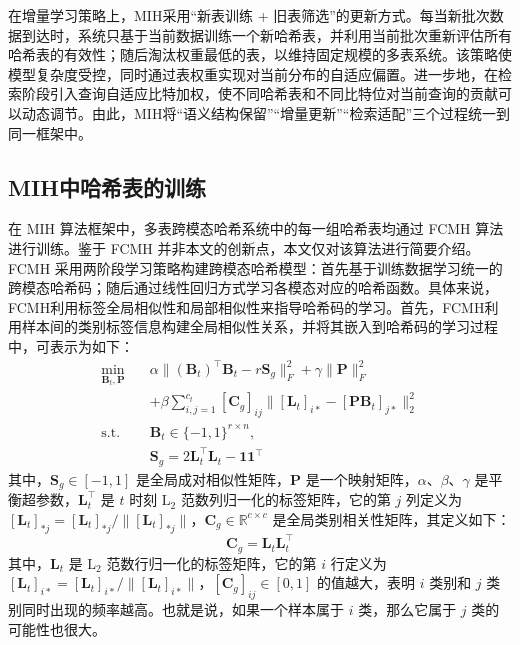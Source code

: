 在增量学习策略上，MIH采用“新表训练 + 旧表筛选”的更新方式。每当新批次数据到达时，系统只基于当前数据训练一个新哈希表，并利用当前批次重新评估所有哈希表的有效性；随后淘汰权重最低的表，以维持固定规模的多表系统。该策略使模型复杂度受控，同时通过表权重实现对当前分布的自适应偏置。进一步地，在检索阶段引入查询自适应比特加权，使不同哈希表和不同比特位对当前查询的贡献可以动态调节。由此，MIH将“语义结构保留”“增量更新”“检索适配”三个过程统一到同一框架中。

\subsection{MIH中哈希表的训练}
在 MIH 算法框架中，多表跨模态哈希系统中的每一组哈希表均通过 FCMH 算法进行训练。鉴于 FCMH 并非本文的创新点，本文仅对该算法进行简要介绍。FCMH 采用两阶段学习策略构建跨模态哈希模型：首先基于训练数据学习统一的跨模态哈希码；随后通过线性回归方式学习各模态对应的哈希函数。具体来说，FCMH利用标签全局相似性和局部相似性来指导哈希码的学习。首先，FCMH利用样本间的类别标签信息构建全局相似性关系，并将其嵌入到哈希码的学习过程中，可表示为如下：
\begin{equation}
  \begin{aligned}
    \min_{\mathbf{B}_t,\mathbf{P}} \quad
    & \alpha \|(\mathbf{B}_t)^{\top} \mathbf{B}_t - r \mathbf{S}_g\|_F^2 + \gamma \|\mathbf{P}\|_F^2 \\
    & + \beta \sum_{i,j=1}^{c_t} [\mathbf{C}_g]_{ij}
    \|[\mathbf{L}_t]_{i*} - [\mathbf{P}\mathbf{B}_t]_{j*}\|_2^2 \\
    \text{s.t.} \quad
    & \mathbf{B}_t \in \{-1,1\}^{r \times n}, \\
    & \mathbf{S}_g = 2\mathbf{L}_t^{\top}\mathbf{L}_t - \mathbf{1}\mathbf{1}^{\top}
  \end{aligned}
\end{equation}
其中，$\mathbf{S}_g \in [-1,1]$ 是全局成对相似性矩阵，$\mathbf{P}$ 是一个映射矩阵，$\alpha$、$\beta$、$\gamma$ 是平衡超参数，$\mathbf{L}_t^{\top}$ 是 $t$ 时刻 $\text{L}_2$ 范数列归一化的标签矩阵，它的第 $j$ 列定义为 $[\mathbf{L}_t]_{*j} = [\mathbf{L}_t]_{*j} / \|[\mathbf{L}_t]_{*j}\|$，$\mathbf{C}_g \in \mathbb{R}^{c \times c}$ 是全局类别相关性矩阵，其定义如下：
\begin{equation}
  \mathbf{C}_g = \mathbf{L}_t\mathbf{L}_t^{\top}
\end{equation}
其中，$\mathbf{L}_t$ 是 $\text{L}_2$ 范数行归一化的标签矩阵，它的第 $i$ 行定义为 $[\mathbf{L}_t]_{i*} = [\mathbf{L}_t]_{i*} / \|[\mathbf{L}_t]_{i*}\|$，$[\mathbf{C}_g]_{ij} \in [0,1]$ 的值越大，表明 $i$ 类别和 $j$ 类别同时出现的频率越高。也就是说，如果一个样本属于 $i$ 类，那么它属于 $j$ 类的可能性也很大。

